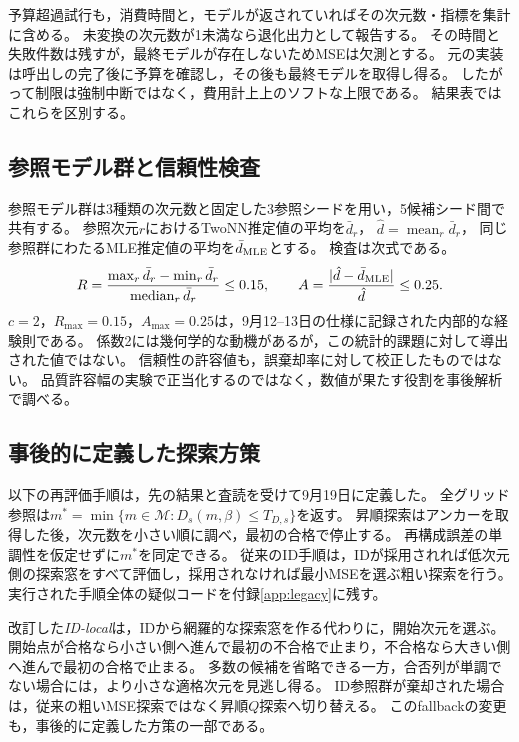 \documentclass[11pt,a4paper]{ltjsarticle}
\begin{document}
予算超過試行も，消費時間と，モデルが返されていればその次元数・指標を集計に含める。
未変換の次元数が1未満なら退化出力として報告する。
その時間と失敗件数は残すが，最終モデルが存在しないためMSEは欠測とする。
元の実装は呼出しの完了後に予算を確認し，その後も最終モデルを取得し得る。
したがって制限は強制中断ではなく，費用計上上のソフトな上限である。
結果表ではこれらを区別する。

\subsection{参照モデル群と信頼性検査}\label{sec:algorithm}
参照モデル群は3種類の次元数と固定した3参照シードを用い，5候補シード間で共有する。
参照次元$r$におけるTwoNN推定値の平均を$\bar d_r$，
$\hat d=\operatorname{mean}_r\bar d_r$，
同じ参照群にわたるMLE推定値の平均を$\bar d_{\rm MLE}$とする。
検査は次式である。
\begin{equation}
 R=\frac{\max_r\bar d_r-\min_r\bar d_r}{\operatorname{median}_r\bar d_r}
 \le0.15,\qquad
 A=\frac{|\hat d-\bar d_{\rm MLE}|}{\hat d}\le0.25.
 \label{eq:checks}
\end{equation}
$c=2$，$R_{\max}=0.15$，$A_{\max}=0.25$は，9月12--13日の仕様に記録された内部的な経験則である。
係数2には幾何学的な動機があるが，この統計的課題に対して導出された値ではない。
信頼性の許容値も，誤棄却率に対して校正したものではない。
品質許容幅の実験で正当化するのではなく，数値が果たす役割を事後解析で調べる。

\subsection{事後的に定義した探索方策}\label{sec:replay}
以下の再評価手順は，先の結果と査読を受けて9月19日に定義した。
全グリッド参照は$m^*=\min\{m\in\mathcal M:D_s(m,\beta)\le T_{D,s}\}$を返す。
昇順探索はアンカーを取得した後，次元数を小さい順に調べ，最初の合格で停止する。
再構成誤差の単調性を仮定せずに$m^*$を同定できる。
従来のID手順は，IDが採用されれば低次元側の探索窓をすべて評価し，採用されなければ最小MSEを選ぶ粗い探索を行う。
実行された手順全体の疑似コードを付録\ref{app:legacy}に残す。

改訂した\emph{ID-local}は，IDから網羅的な探索窓を作る代わりに，開始次元を選ぶ。
開始点が合格なら小さい側へ進んで最初の不合格で止まり，不合格なら大きい側へ進んで最初の合格で止まる。
多数の候補を省略できる一方，合否列が単調でない場合には，より小さな適格次元を見逃し得る。
ID参照群が棄却された場合は，従来の粗いMSE探索ではなく昇順$Q$探索へ切り替える。
このfallbackの変更も，事後的に定義した方策の一部である。
\end{document}
